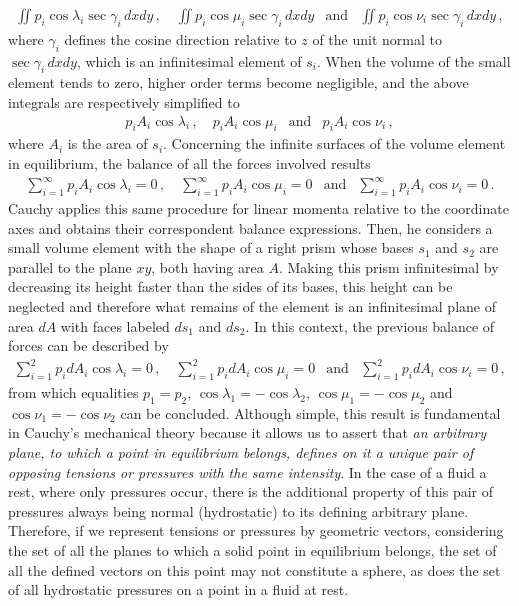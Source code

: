 \begin{eqnarray*}
\iint p_i\cos\lambda_i\sec\gamma_i\,dxdy\,, \quad \iint p_i\cos\mu_i\sec\gamma_i\,dxdy &\text{and}& \iint p_i\cos\nu_i\sec\gamma_i\,dxdy\,,
\end{eqnarray*}
where $\gamma_i$ defines the cosine direction relative to $z$ of the unit normal to $\sec\gamma_i\,dxdy$, which is an infinitesimal element of $s_i$. When the volume of the small element tends to zero, higher order terms become negligible, and the above integrals are respectively simplified to        
\begin{eqnarray*}
p_iA_i\cos\lambda_i\,, \quad p_iA_i\cos\mu_i  &\text{and}& p_iA_i\cos\nu_i\,,
\end{eqnarray*}
where $A_i$ is the area of $s_i$. Concerning the infinite surfaces of the volume element in equilibrium, the balance of all the forces involved results
\begin{eqnarray*}
\sum_{i=1}^\infty p_iA_i\cos\lambda_i=0\,, \quad \sum_{i=1}^\infty p_iA_i\cos\mu_i=0 &\text{and}& \sum_{i=1}^\infty p_iA_i\cos\nu_i=0\,.
\end{eqnarray*}
Cauchy applies this same procedure for linear momenta relative to the coordinate axes and obtains their correspondent balance expressions. Then, he considers a small volume element with the shape of a right prism whose bases $s_1$ and $s_2$ are parallel to the plane $xy$, both having area $A$. Making this prism infinitesimal by decreasing its height faster than the sides of its bases, this height can be neglected and therefore what remains of the element is an infinitesimal plane of area $dA$ with faces labeled $ds_1$ and $ds_2$. In this context, the previous balance of forces can be described by  
\begin{eqnarray*}
\sum_{i=1}^2 p_idA_i\cos\lambda_i=0\,, \quad \sum_{i=1}^2 p_idA_i\cos\mu_i=0 &\text{and}& \sum_{i=1}^2 p_idA_i\cos\nu_i=0\,,
\end{eqnarray*}
from which equalities $p_1=p_2$, $\cos\lambda_1=-\cos\lambda_2$, $\cos\mu_1=-\cos\mu_2$ and  $\cos\nu_1=-\cos\nu_2$ can be concluded. Although simple, this result is fundamental in Cauchy's mechanical theory because it allows us to assert that \emph{an arbitrary plane, to which a point in equilibrium belongs, defines on it a unique pair of opposing tensions or pressures with the same intensity}. In the case of a fluid a rest, where only pressures occur, there is the additional property of this pair of pressures always being normal (hydrostatic) to its defining arbitrary plane. Therefore, if we represent tensions or pressures by geometric vectors, considering the set of all the planes to which a solid point in equilibrium belongs, the set of all the defined vectors on this point may not constitute a sphere, as does the set of all hydrostatic pressures on a point in a fluid at rest.         



